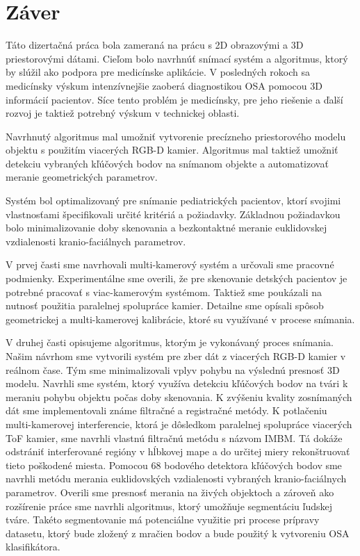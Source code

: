\chapter{Záver}

\pagestyle{fancy}
\fancyhf{}
\fancyfoot[CE,CO]{\thepage}


Táto dizertačná práca bola zameraná na prácu s 2D obrazovými a 3D priestorovými dátami. Cieľom bolo navrhnúť snímací systém a algoritmus, ktorý by slúžil ako podpora pre medicínske aplikácie. V posledných rokoch sa medicínsky výskum intenzívnejšie zaoberá diagnostikou OSA pomocou 3D informácií pacientov. Síce tento problém je medicínsky, pre jeho riešenie a ďalší rozvoj je taktiež potrebný výskum v technickej oblasti. \newline

Navrhnutý algoritmus mal umožniť vytvorenie precízneho priestorového modelu objektu s použitím viacerých RGB-D kamier. Algoritmus mal taktiež umožniť detekciu vybraných kľúčových bodov na snímanom objekte a automatizovať meranie geometrických parametrov.  \newline

Systém bol optimalizovaný pre snímanie pediatrických pacientov, ktorí svojimi vlastnosťami špecifikovali určité kritériá a požiadavky. Základnou požiadavkou bolo minimalizovanie doby skenovania a bezkontaktné meranie euklidovskej vzdialenosti kranio-faciálnych parametrov.  \newline

V prvej časti sme navrhovali multi-kamerový systém a určovali sme pracovné podmienky. Experimentálne sme overili, že pre skenovanie detských pacientov je potrebné pracovať s viac-kamerovým systémom. Taktiež sme poukázali na nutnosť použitia paralelnej spolupráce kamier. Detailne sme opísali spôsob geometrickej a multi-kamerovej kalibrácie, ktoré su využívané v procese snímania.  \newpage

V druhej časti opisujeme algoritmus, ktorým je vykonávaný proces snímania. Našim návrhom sme vytvorili systém pre zber dát z viacerých RGB-D kamier v reálnom čase. Tým sme minimalizovali vplyv pohybu na výslednú presnosť 3D modelu. Navrhli sme systém, ktorý využíva detekciu kľúčových bodov na tvári k meraniu pohybu objektu počas doby skenovania. K zvýšeniu kvality zosnímaných dát sme implementovali známe filtračné a registračné metódy. K potlačeniu multi-kamerovej interferencie, ktorá je dôsledkom paralelnej spolupráce viacerých ToF kamier, sme navrhli vlastnú filtračnú metódu s názvom IMBM. Tá dokáže odstrániť interferované regióny v hĺbkovej mape a do určitej miery rekonštruovať tieto poškodené miesta. Pomocou 68 bodového detektora kľúčových bodov sme navrhli metódu merania euklidovských vzdialenosti vybraných kranio-faciálnych parametrov. Overili sme presnosť merania na živých objektoch a zároveň ako rozšírenie práce sme navrhli algoritmus, ktorý umožňuje segmentáciu ľudskej tváre. Takéto segmentovanie má potenciálne využitie pri procese prípravy datasetu, ktorý bude zložený z mračien bodov a bude použitý k vytvoreniu OSA klasifikátora. \newline 

